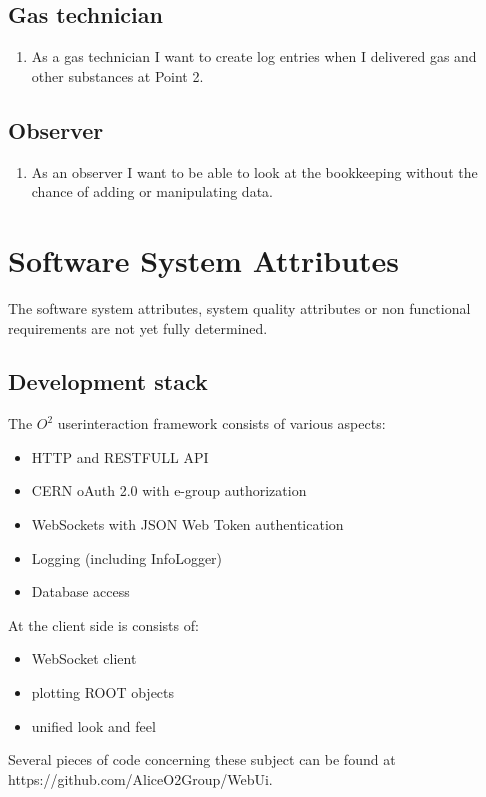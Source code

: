 \subsection{Gas technician}
\begin{enumerate}
  \item As a gas technician I want to create log entries when I delivered gas and other substances at Point 2.
\end{enumerate}

\subsection{Observer}
\begin{enumerate}
  \item As an observer I want to be able to look at the bookkeeping without the chance of adding or manipulating data.
\end{enumerate}

\section{Software System Attributes}
The software system attributes, system quality attributes or non functional requirements are not yet fully determined. 

\subsection{Development stack}
The $O^2$ userinteraction framework consists of various aspects:
\begin{itemize}
  \item HTTP and RESTFULL API
  \item CERN oAuth 2.0 with e-group authorization
  \item WebSockets with JSON Web Token authentication
  \item Logging (including InfoLogger)
  \item Database access
\end{itemize}

At the client side is consists of:
\begin{itemize}
  \item WebSocket client
  \item plotting ROOT objects
  \item unified look and feel
\end{itemize}
Several pieces of code concerning these subject can be found at https://\-github.com/\-AliceO2Group/WebUi.

